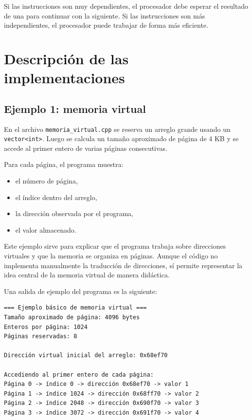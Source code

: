 \documentclass[11pt,a4paper]{article}
\begin{document}
Si las instrucciones son muy dependientes, el procesador debe esperar el resultado de una para continuar con la siguiente. Si las instrucciones son más independientes, el procesador puede trabajar de forma más eficiente.

\section{Descripción de las implementaciones}

\subsection{Ejemplo 1: memoria virtual}

En el archivo \texttt{memoria\_virtual.cpp} se reserva un arreglo grande usando un \texttt{vector<int>}. Luego se calcula un tamaño aproximado de página de 4 KB y se accede al primer entero de varias páginas consecutivas.

Para cada página, el programa muestra:

\begin{itemize}
\item el número de página,
\item el índice dentro del arreglo,
\item la dirección observada por el programa,
\item el valor almacenado.
\end{itemize}

Este ejemplo sirve para explicar que el programa trabaja sobre direcciones virtuales y que la memoria se organiza en páginas. Aunque el código no implementa manualmente la traducción de direcciones, sí permite representar la idea central de la memoria virtual de manera didáctica.

Una salida de ejemplo del programa es la siguiente:

\begin{verbatim}
=== Ejemplo básico de memoria virtual ===
Tamaño aproximado de página: 4096 bytes
Enteros por página: 1024
Páginas reservadas: 8

Dirección virtual inicial del arreglo: 0x68ef70

Accediendo al primer entero de cada página:
Página 0 -> índice 0 -> dirección 0x68ef70 -> valor 1
Página 1 -> índice 1024 -> dirección 0x68ff70 -> valor 2
Página 2 -> índice 2048 -> dirección 0x690f70 -> valor 3
Página 3 -> índice 3072 -> dirección 0x691f70 -> valor 4
\end{verbatim}
\end{document}
